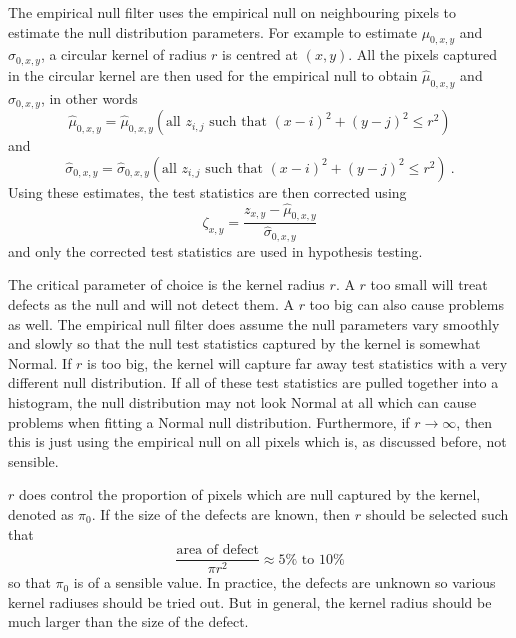 The empirical null filter uses the empirical null on neighbouring pixels to estimate the null distribution parameters. For example to estimate $\mu_{0,x,y}$ and $\sigma_{0,x,y}$, a circular kernel of radius $r$ is centred at $(x,y)$. All the pixels captured in the circular kernel are then used for the empirical null to obtain $\widehat{\mu}_{0,x,y}$ and $\widehat{\sigma}_{0,x,y}$, in other words
\begin{equation}
  \widehat{\mu}_{0,x,y}
  =
  \widehat{\mu}_{0,x,y}
    \left(
      \text{all }z_{i,j}\text{ such that }(x-i)^2+(y-j)^2\leqslant r^2
    \right)
\end{equation}
and
\begin{equation}
  \widehat{\sigma}_{0,x,y}
  =
  \widehat{\sigma}_{0,x,y}
    \left(
      \text{all }z_{i,j}\text{ such that }(x-i)^2+(y-j)^2\leqslant r^2
    \right)
  \ .
\end{equation}
Using these estimates, the test statistics are then corrected using
\begin{equation}
  \zeta_{x,y} = 
  \dfrac{
    z_{x,y}-\widehat{\mu}_{0,x,y}
  }
  {
    \widehat{\sigma}_{0,x,y}
  }
\end{equation}
and only the corrected test statistics are used in hypothesis testing.

The critical parameter of choice is the kernel radius $r$. A $r$ too small will treat defects as the null and will not detect them. A $r$ too big can also cause problems as well. The empirical null filter does assume the null parameters vary smoothly and slowly so that the null test statistics captured by the kernel is somewhat Normal. If $r$ is too big, the kernel will capture far away test statistics with a very different null distribution. If all of these test statistics are pulled together into a histogram, the null distribution may not look Normal at all which can cause problems when fitting a Normal null distribution. Furthermore, if $r\rightarrow \infty$, then this is just using the empirical null on all pixels which is, as discussed before, not sensible.

$r$ does control the proportion of pixels which are null captured by the kernel, denoted as $\pi_0$. If the size of the defects are known, then $r$ should be selected such that
\begin{equation}
\dfrac{
  \text{area of defect}
}
{
  \pi r^2
}
\approx
5\% \text{ to } 10 \%
\end{equation}
so that $\pi_0$ is of a sensible value. In practice, the defects are unknown so various kernel radiuses should be tried out. But in general, the kernel radius should be much larger than the size of the defect.

